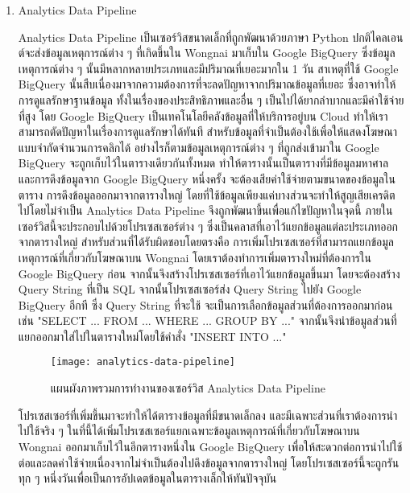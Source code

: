 \begin{enumerate}
	\item Analytics Data Pipeline
	
	Analytics Data Pipeline เป็นเซอร์วิสขนาดเล็กที่ถูกพัฒนาด้วยภาษา Python ปกติไคลเอนต์จะส่งข้อมูลเหตุการณ์ต่าง ๆ ที่เกิดขึ้นใน Wongnai มาเก็บใน Google BigQuery ซึ่งข้อมูลเหตุการณ์ต่าง ๆ นั้นมีหลากหลายประเภทและมีปริมาณที่เยอะมากใน 1 วัน สาเหตุที่ใช้ Google BigQuery นั้นสืบเนื่องมาจากความต้องการที่จะลดปัญหาจากปริมาณข้อมูลที่เยอะ ซึ่งอาจทำให้การดูแลรักษาฐานข้อมูล ทั้งในเรื่องของประสิทธิภาพและอื่น ๆ เป็นไปได้ยากลำบากและมีค่าใช้จ่ายที่สูง โดย Google BigQuery เป็นเทคโนโลยีคลังข้อมูลที่ให้บริการอยู่บน Cloud ทำให้เราสามารถตัดปัญหาในเรื่องการดูแลรักษาได้ทันที สำหรับข้อมูลที่จำเป็นต้องใช้เพื่อให้แสดงโฆษณาแบบจำกัดจำนวนการคลิกได้ อย่างไรก็ตามข้อมูลเหตุการณ์ต่าง ๆ ที่ถูกส่งเข้ามาใน Google BigQuery จะถูกเก็บไว้ในตารางเดียวกันทั้งหมด ทำให้ตารางนั้นเป็นตารางที่มีข้อมูลมหาศาล และการดึงข้อมูลจาก Google BigQuery หนึ่งครั้ง จะต้องเสียค่าใช้จ่ายตามขนาดของข้อมูลในตาราง การดึงข้อมูลออกมาจากตารางใหญ่ โดยที่ใช้ข้อมูลเพียงแค่บางส่วนจะทำให้สูญเสียเครดิตไปโดยไม่จำเป็น Analytics Data Pipeline จึงถูกพัฒนาขึ้นเพื่อแก้ไขปัญหาในจุดนี้ ภายในเซอร์วิสนี้จะประกอบไปด้วยโปรเซสเซอร์ต่าง ๆ ซึ่งเป็นคลาสที่เอาไว้แยกข้อมูลแต่ละประเภทออกจากตารางใหญ่ สำหรับส่วนที่ได้รับผิดชอบโดยตรงคือ การเพิ่มโปรเซสเซอร์ที่สามารถแยกข้อมูลเหตุการณ์ที่เกี่ยวกับโฆษณาบน Wongnai โดยเราต้องทำการเพิ่มตารางใหม่ที่ต้องการใน Google BigQuery ก่อน จากนั้นจึงสร้างโปรเซสเซอร์ที่เอาไว้แยกข้อมูลขึ้นมา โดยจะต้องสร้าง Query String ที่เป็น SQL จากนั้นโปรเซสเซอร์ส่ง Query String ไปยัง Google BigQuery อีกที ซึ่ง Query String ที่จะใช้ จะเป็นการเลือกข้อมูลส่วนที่ต้องการออกมาก่อน เช่น "SELECT ... FROM ... WHERE ... GROUP BY ..." จากนั้นจึงนำข้อมูลส่วนที่แยกออกมาใส่ไปในตารางใหม่โดยใช้คำสั่ง "INSERT INTO ..."
	
	\begin{figure}[!h]
		\centering
		\texttt{[image: analytics-data-pipeline]}  
		\caption{แผนผังภาพรวมการทำงานของเซอร์วิส Analytics Data Pipeline}
		\label{Fig:analytics-data-pipeline}
	\end{figure}
	
	โปรเซสเซอร์ที่เพิ่มขึ้นมาจะทำให้ได้ตารางข้อมูลที่มีขนาดเล็กลง และมีเฉพาะส่วนที่เราต้องการนำไปใช้จริง ๆ ในที่นี้ได้เพิ่มโปรเซสเซอร์แยกเฉพาะข้อมูลเหตุการณ์ที่เกี่ยวกับโฆษณาบน Wongnai ออกมาเก็บไว้ในอีกตารางหนึ่งใน Google BigQuery เพื่อให้สะดวกต่อการนำไปใช้ต่อและลดค่าใช้จ่ายเนื่องจากไม่จำเป็นต้องไปดึงข้อมูลจากตารางใหญ่ โดยโปรเซสเซอร์นี้จะถูกรันทุก ๆ หนึ่งวันเพื่อเป็นการอัปเดตข้อมูลในตารางเล็กให้ทันปัจจุบัน
	

\end{enumerate}
